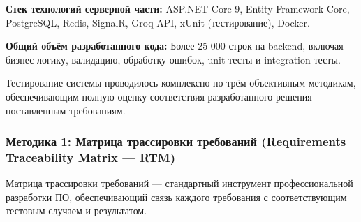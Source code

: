 \textbf{Стек технологий серверной части:} ASP.NET Core 9, Entity Framework Core, PostgreSQL, Redis, SignalR, Groq API, xUnit (тестирование), Docker.

\textbf{Общий объём разработанного кода:} Более 25 000 строк на backend, включая бизнес-логику, валидацию, обработку ошибок, unit-тесты и integration-тесты.


Тестирование системы проводилось комплексно по трём объективным методикам, обеспечивающим полную оценку соответствия разработанного решения поставленным требованиям.

\subsubsection*{Методика 1: Матрица трассировки требований (Requirements Traceability Matrix --- RTM)}

Матрица трассировки требований --- стандартный инструмент профессиональной разработки ПО, обеспечивающий связь каждого требования с соответствующим тестовым случаем и результатом.

